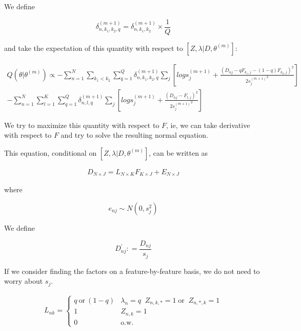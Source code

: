 \documentclass[11pt,authoryear]{article}
\begin{document}
%
%
%
%

We define 

$$ \delta^{(m+1)}_{n, k_1, k_2,q} =  \delta^{(m+1)}_{n, k_1, k_2} \times \frac{1}{Q}  $$ 

and take the expectation of this quantity with respect to $\left [ Z, \lambda | D, \theta^{(m)} \right ]$:

\begin{eqnarray}
 Q (\theta | \theta^{(m)}) \propto - \sum_{n=1}^{N} \sum_{k_1 < k_2} \sum_{q=1}^{Q} \delta^{(m+1)}_{n, k_1, k_2, q}  \sum_{j} \left [ log s^{(m+1)}_{j} + \frac{(D_{nj} - q F_{k_1,j} - (1-q) F_{k_2,j})^2}{2{s_j^{(m+1)}}^2} \right] \\
 -   \sum_{n=1}^{N} \sum_{l=1}^{K} \sum_{q=1}^{Q} \delta^{(m+1)}_{n, l, q}  \sum_{j} \left [ log s^{(m+1)}_{j} + \frac{(D_{nj} - F_{l,j})^2}{2{s_j^{(m+1)}}^2} \right] 
\end{eqnarray}

We try to maximize this quantity with respect to $F$, ie, we can take derivative with respect to $F$ and try to solve the resulting normal equation.

This equation, conditional on $\left [ Z, \lambda | D, \theta^{(m)} \right ]$, can be written as 

\begin{eqnarray}
 D_{N \times J} = L_{N \times K} F_{K \times J} + E_{N \times J}
\end{eqnarray}

where 

$$ e_{nj} \sim N(0, s^2_{j}) $$

We define 

$$ D^{'}_{nj} : = \frac{D_{nj}}{s_{j}} $$

If we consider finding the factors on a feature-by-feature basis, we do not need to worry about $s_j$.

\begin{align*}
L_{nk} =
\begin{cases}
    q~\text{or}~(1-q) & \lambda_{n}=q  \; \; Z_{n,k,*}=1 \; \text{or} \;\; Z_{n, *, k} = 1 \\
    1 & Z_{n,k}=1 \\
    0 & \text{o.w.}
\end{cases}
\end{align*}
\end{document}
